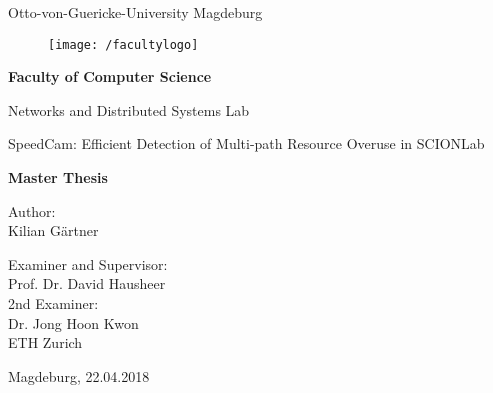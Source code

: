 \documentclass[thesis.tex]{subfiles}
\begin{document}
\thispagestyle {empty}

\begin{center}
\begin{Large}
Otto-von-Guericke-University Magdeburg\\

\begin{figure}
	\centering
	\texttt{[image: /facultylogo]}
	\label{fig:logoinffak}
\end{figure}

\vspace{3mm}


\textbf{Faculty of Computer Science}\\
\end{Large}

\vspace{3mm}

Networks and Distributed Systems Lab\\

\vspace{1cm}
\begin{Huge}
SpeedCam: Efficient Detection of Multi-path Resource Overuse in SCIONLab \\
\end{Huge}
\vspace{15mm}
{\Huge \textbf{Master Thesis}}\\
\vspace{15mm}

Author:\\
\vspace{4mm}
{\huge Kilian G\"{a}rtner}\\

\vspace{16mm}

Examiner and Supervisor:\\
\vspace{2mm}
{\Large Prof. Dr. David Hausheer}\\
\vspace{5mm}
2nd Examiner:\\
\vspace{2mm}
{\Large Dr. Jong Hoon Kwon}\\
{ETH Zurich}

\vspace{35mm}

{\large Magdeburg, 22.04.2018}\\

\vspace{40mm}

\end{center}
\clearpage
\end{document}
